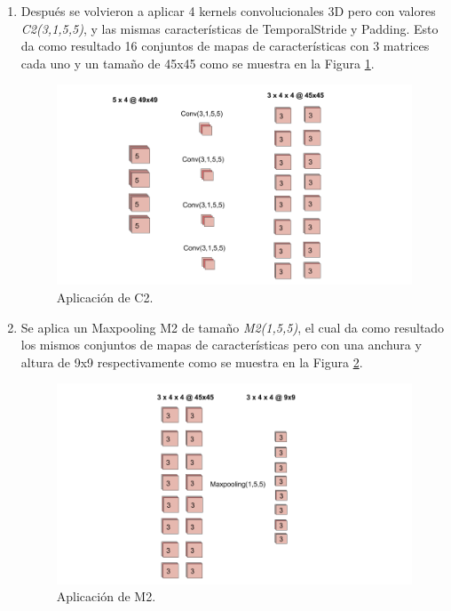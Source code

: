\begin{onehalfspacing}
\begin{enumerate}
    \item Después se volvieron a aplicar 4 kernels convolucionales 3D pero con valores \textit{C2(3,1,5,5)}, y las mismas características de TemporalStride y Padding. Esto da como resultado 16 conjuntos de mapas de características con 3 matrices cada uno y un tamaño de 45x45 como se muestra en la Figura \ref{fig:Fig_Piloto_C2}.
    \begin{figure}[h!]
	\centering
	\includegraphics[width=12cm,keepaspectratio]{XX_Figures/Fig_Piloto_C2.png}
	\caption{\footnotesize Aplicación de C2.}
	\label{fig:Fig_Piloto_C2}
    \end{figure}
    
    \item Se aplica un Maxpooling M2 de tamaño \textit{M2(1,5,5)}, el cual da como resultado los mismos conjuntos de mapas de características pero con una anchura y altura de 9x9 respectivamente como se muestra en la Figura \ref{fig:Fig_Piloto_M2}. 
    \begin{figure}[h!]
	\centering
	\includegraphics[width=14cm,keepaspectratio]{XX_Figures/Fig_Piloto_M2.png}
	\caption{\footnotesize Aplicación de M2.}
	\label{fig:Fig_Piloto_M2}
    \end{figure}
    

\end{enumerate}
\end{onehalfspacing}
